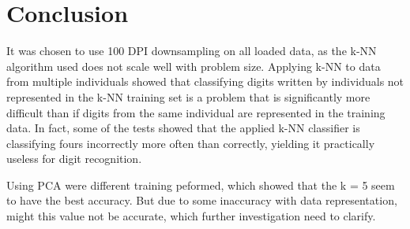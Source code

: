 \section{Conclusion}
\label{sec:conclusion}
It was chosen to use 100 DPI downsampling on all loaded data,
as the k-NN algorithm used does not scale well with problem size.
Applying k-NN to data from multiple individuals showed that
classifying digits written by individuals not represented
in the k-NN training set is a problem that is significantly
more difficult than if digits from the same individual are
represented in the training data.
In fact, some of the tests showed that the applied k-NN classifier
is classifying fours incorrectly more often than correctly,
yielding it practically useless for digit recognition.

Using PCA were different training peformed, which showed that the k =  5 seem to have the best accuracy.  But due to some inaccuracy with data representation, might this value not be accurate, which further investigation need to clarify. 